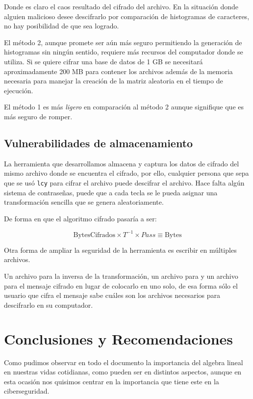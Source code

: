 \documentclass[a4paper]{article}
\begin{document}
Donde es claro el caos resultado del cifrado del archivo. En la situación donde
alguien malicioso desee descifrarlo por comparación de histogramas de
caracteres, no hay posibilidad de que sea logrado.

El método 2, aunque promete ser aún más seguro permitiendo la generación de
histogramas sin ningún sentido, requiere más recursos del computador donde se
utiliza. Si se quiere cifrar una base de datos de 1 GB se necesitará
aproximadamente 200 MB para contener los archivos además de la memoria
necesaria para manejar la creación de la matriz aleatoria en el tiempo de
ejecución.

El método 1 es más \textit{ligero} en comparación al método 2 aunque signifique
que es más seguro de romper.

\subsection{Vulnerabilidades de almacenamiento}

La herramienta que desarrollamos almacena y captura los datos de cifrado del
mismo archivo donde se encuentra el cifrado, por ello, cualquier persona que
sepa que se usó \texttt{lcy} para cifrar el archivo puede descifrar el archivo.
Hace falta algún sistema de contraseñas, puede que a cada tecla se le pueda
asignar una transformación sencilla que se genera aleatoriamente. 

De forma en que el algoritmo cifrado pasaría a ser:

\[
\text{BytesCifrados} \times T^{-1} \times Pass \equiv \text{Bytes}
\]

Otra forma de ampliar la seguridad de la herramienta es escribir en múltiples
archivos. 

Un archivo para la inversa de la transformación, un archivo para
 y un archivo para el mensaje cifrado en lugar de colocarlo
en uno solo, de esa forma sólo el usuario que cifra el mensaje sabe cuáles son
los archivos necesarios para descifrarlo en su computador.

\newpage
\section{Conclusiones y Recomendaciones}

Como pudimos observar en todo el documento la importancia del algebra lineal en
nuestras vidas cotidianas, como pueden ser en distintos aspectos, aunque en
esta ocasión nos quisimos centrar en la importancia que tiene este en la
ciberseguridad.
\end{document}
